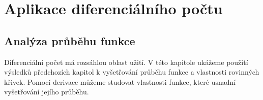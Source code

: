 \setchaptertoc
\chapter{Aplikace diferenciálního počtu}\label{mai:IchapVI}

\section{Analýza průběhu funkce}\label{mai:IchapVIsecI}
  Diferenciální počet má rozsáhlou oblast užití. V této kapitole ukážeme použití výsledků
  předchozích kapitol k vyšetřování průběhu funkce a vlastnosti rovinných křivek. Pomocí derivace
  můžeme studovat vlastnosti funkce, které usnadní vyšetřování jejího průběhu. 

